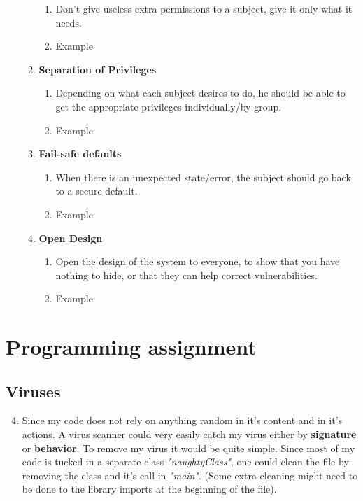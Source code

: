 \documentclass[12pt]{article}
\begin{document}
\begin{enumerate}
\begin{enumerate}
\begin{enumerate}
					\item Don't give useless extra permissions to a subject, give it only what it needs.
					\item Example
				\end{enumerate}
			\item \textbf{Separation of Privileges}
				\begin{enumerate}
					\item Depending on what each subject desires to do, he should be able to get the appropriate privileges individually/by group.
					\item Example
				\end{enumerate}
			\item \textbf{Fail-safe defaults}
				\begin{enumerate}
					\item When there is an unexpected state/error, the subject should go back to a secure default.
					\item Example
				\end{enumerate}
			\item \textbf{Open Design}
				\begin{enumerate}
					\item Open the design of the system to everyone, to show that you have nothing to hide, or that they can help correct vulnerabilities.
					\item Example
				\end{enumerate}
		\end{enumerate}		
\end{enumerate}

\section*{Programming assignment}
\subsection*{Viruses}
\begin{enumerate}[label=(\alph*)]
	\setcounter{enumi}{3}
 	\item Since my code does not rely on anything random in it's content and in it's actions. A virus scanner could very easily catch my virus either by \textbf{signature} or \textbf{behavior}. To remove my virus it would be quite simple. Since most of my code is tucked in a separate class \textit{"naughtyClass"}, one could clean the file by removing the class and it's call in \textit{"main"}. (Some extra cleaning might need to be done to the library imports at the beginning of the file). \par
\end{enumerate}
\end{document}

